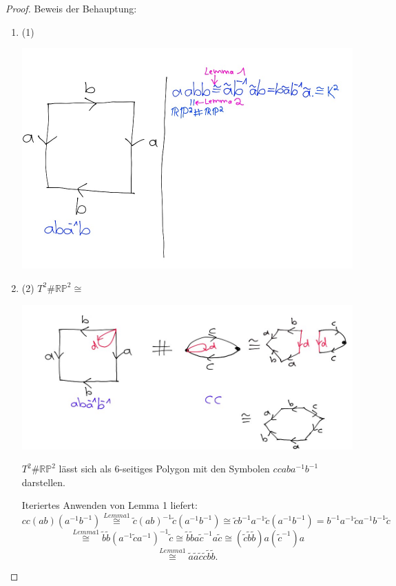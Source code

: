 \documentclass[a4paper,11pt,notitlepage]{report}
\theoremstyle{definition}
\newcommand{\R}{{\ensuremath{\mathbb{R}}}}
\newcommand{\Prim}{{\ensuremath{\mathbb{P}}}}
\begin{document}
\newpage 

\begin{proof}{Beweis der Behauptung:}
	\begin{enumerate}
		\item (1) \begin{center}
		\includegraphics[scale=0.3]{images/2012_01_30_Bild5.jpg}
	\end{center}
		\item (2)
		$T^2 \# \R \Prim^2 \cong $
		\begin{center}
		\includegraphics[scale=0.3]{images/2012_01_30_Bild6.jpg}
	\end{center}
		$T^2 \# \R \Prim^2$ lässt sich als 6-seitiges Polygon mit den Symbolen $ccaba^{-1}b^{-1}$ darstellen.
		
		Iteriertes Anwenden von Lemma 1 liefert:
		$$cc(ab)(a^{-1}b^{-1}) \overset{Lemma 1}{\cong} \widetilde{c} (ab)^{-1} \widetilde{c} (a^{-1}b^{-1}) \cong \widetilde{c} b^{-1} a^{-1} \widetilde{c} (a^{-1} b^{-1}) = b^{-1}a^{-1}\widetilde{c} a^{-1} b^{-1} \widetilde{c}$$
		$$\overset{Lemma 1}{\cong} \widetilde{b} \widetilde{b} (a^{-1} \widetilde{c} a^{-1})^{-1} \widetilde{c} \cong \widetilde{b} \widetilde{b} a \widetilde{c}^{-1} a \widetilde{c} \cong (\widetilde{c} \widetilde{b} \widetilde{b}) a (\widetilde{c}^{-1}) a$$
		$$\overset{Lemma 1}{\cong} \widetilde{a} \widetilde{a} \widetilde{c} \widetilde{c} \widetilde{b} \widetilde{b}.$$
	\end{enumerate}
\end{proof}
\end{document}
